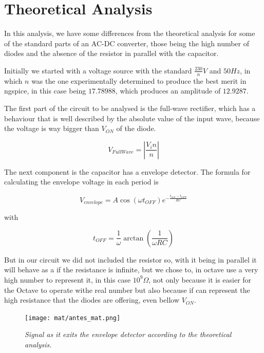 \section{Theoretical Analysis}

In this analysis, we have some differences from the theoretical analysis for some of the standard parts of an AC-DC converter, those being the high number of diodes and the absence of the resistor in parallel with the capacitor.

Initially we started with a voltage source with the standard $\frac{230}{n}V$ and $50Hz$, in which $n$ was the one experimentally determined to produce the best merit in ngspice, in this case being $17.78988$, which produces an amplitude of $12.9287$.

The first part of the circuit to be analysed is the full-wave rectifier, which has a behaviour that is well described by the absolute value of the input wave, because the voltage is way bigger than $V_{ON}$ of the diode.

\begin{equation}
    V_{Full Wave} = \left|\frac{V_in}{n}\right|
    \label{eq:fullwave_mat}
\end{equation}

The next component is the capacitor has a envelope detector. The formula for calculating the envelope voltage in each period is 

\begin{equation}
    V_{envelope}=A\cos{(\omega t_{OFF})}e^{-\frac{t_{ON}-t_{OFF}}{RC}}
\end{equation}

with 

\begin{equation}
    t_{OFF}=\frac{1}{\omega}\arctan\left(\frac{1}{\omega R C}\right)
\end{equation}

But in our circuit we did not included the resistor so, with it being in parallel it will behave as a if the resistance is infinite, but we chose to, in octave use a very high number to represent it, in this case $10^9\Omega$, not only because it is easier for the Octave to operate withe real number but also because if can represent the high resistance that the diodes are offering, even bellow $V_{ON}$.

\begin{figure}[H]
    \centering
    \texttt{[image: mat/antes\_mat.png]}
        \caption{\textit{Signal as it exits the envelope detector according to the theoretical analysis.}}
    \label{fig:plot}
\end{figure}

